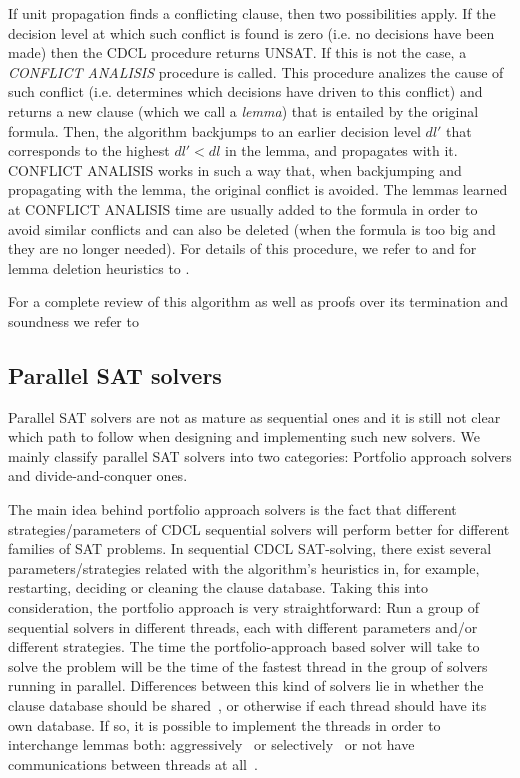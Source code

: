 If unit propagation finds a conflicting clause, then two possibilities
apply. If the decision level at which such conflict is found is zero
(i.e. no decisions have been made) then the CDCL procedure returns
UNSAT. If this is not the case, a \emph{CONFLICT ANALISIS} procedure
is called. This procedure analizes the cause of such conflict
(i.e. determines which decisions have driven to this conflict) and
returns a new clause (which we call a \emph{lemma}) that is entailed
by the original formula. Then, the algorithm backjumps to an earlier
decision level $dl'$ that corresponds to the highest $dl'<dl$ in the
lemma, and propagates with it.  CONFLICT ANALISIS works in such a way
that, when backjumping and propagating with the lemma, the original
conflict is avoided. The lemmas learned at CONFLICT ANALISIS time are
usually added to the formula in order to avoid similar conflicts and
can also be deleted (when the formula is too big and they are no
longer needed). For details of this procedure, we refer to
\cite{GRASP1999IEEE,Zhang2001} and for lemma deletion heuristics to
\cite{Relsat97,Goldberg2002DATE,gluclose}.

For a complete review of this algorithm as well as proofs over its
termination and soundness we refer to \cite{Nieuwenhuisetal2006JACM}


\subsection{Parallel SAT solvers}

Parallel SAT solvers are not as mature as sequential ones and it is
still not clear which path to follow when designing and implementing
such new solvers.  We mainly classify parallel SAT solvers into two
categories: Portfolio approach solvers and divide-and-conquer ones.

The main idea behind portfolio approach solvers is the fact that
different strategies/parameters of CDCL sequential solvers will
perform better for different families of SAT problems.  In sequential
CDCL SAT-solving, there exist several parameters/strategies related
with the algorithm's heuristics in, for example, restarting, deciding
or cleaning the clause database. Taking this into consideration, the
portfolio approach is very straightforward: Run a group of sequential
solvers in different threads, each with different parameters and/or
different strategies. The time the portfolio-approach based solver
will take to solve the problem will be the time of the fastest thread
in the group of solvers running in parallel.  Differences between this
kind of solvers lie in whether the clause database should be
shared~\cite{Sartagnan}, or otherwise if each thread should have its
own database. If so, it is possible to implement the threads in order
to interchange lemmas both: aggressively~\cite{ManySAT} or
selectively~\cite{plingeling} or not have communications between
threads at all~\cite{ppfolio}.

